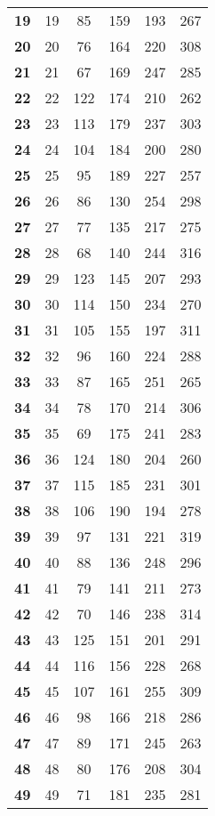 \begin{longtable}{|r|c|c|c|c|c|}
  \textbf{19} & 19 &85 & 159 & 193 & 267 \\
  \textbf{20} & 20 &76 & 164 & 220 & 308 \\
  \textbf{21} & 21 &67 & 169 & 247 & 285 \\
  \textbf{22} & 22 &122 & 174 & 210 & 262 \\
  \textbf{23} & 23 &113 & 179 & 237 & 303 \\
  \textbf{24} & 24 &104 & 184 & 200 & 280 \\
  \textbf{25} & 25 &95 & 189 & 227 & 257 \\
  \textbf{26} & 26 &86 & 130 & 254 & 298 \\
  \textbf{27} & 27 &77 & 135 & 217 & 275 \\
  \textbf{28} & 28 &68 & 140 & 244 & 316 \\
  \textbf{29} & 29 &123 & 145 & 207 & 293 \\
  \textbf{30} & 30 &114 & 150 & 234 & 270 \\
  \textbf{31} & 31 &105 & 155 & 197 & 311 \\
  \textbf{32} & 32 &96 & 160 & 224 & 288 \\
  \textbf{33} & 33 &87 & 165 & 251 & 265 \\
  \textbf{34} & 34 &78 & 170 & 214 & 306 \\
  \textbf{35} & 35 &69 & 175 & 241 & 283 \\
  \textbf{36} & 36 &124 & 180 & 204 & 260 \\
  \textbf{37} & 37 &115 & 185 & 231 & 301 \\
  \textbf{38} & 38 &106 & 190 & 194 & 278 \\
  \textbf{39} & 39 &97 & 131 & 221 & 319 \\
  \textbf{40} & 40 &88 & 136 & 248 & 296 \\
  \textbf{41} & 41 &79 & 141 & 211 & 273 \\
  \textbf{42} & 42 &70 & 146 & 238 & 314 \\
  \textbf{43} & 43 &125 & 151 & 201 & 291 \\
  \textbf{44} & 44 &116 & 156 & 228 & 268 \\
  \textbf{45} & 45 &107 & 161 & 255 & 309 \\
  \textbf{46} & 46 &98 & 166 & 218 & 286 \\
  \textbf{47} & 47 &89 & 171 & 245 & 263 \\
  \textbf{48} & 48 &80 & 176 & 208 & 304 \\
  \textbf{49} & 49 &71 & 181 & 235 & 281 \\

\end{longtable}
